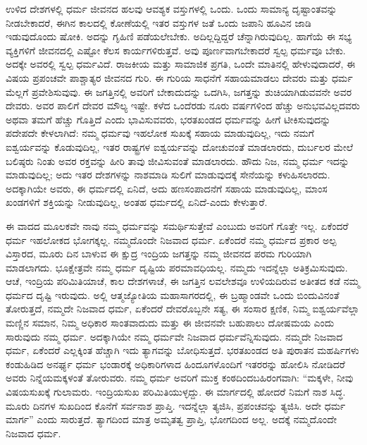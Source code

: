 ಉಳಿದ ದೇಶಗಳಲ್ಲಿ ಧರ್ಮ ಜೀವನದ ಹಲವು ಆವಶ್ಯಕ ವಸ್ತುಗಳಲ್ಲಿ ಒಂದು. ಒಂದು ಸಾಮಾನ್ಯ ದೃಷ್ಟಾಂತವನ್ನು ನೀಡಬೇಕಾದರೆ, ಈಗಿನ ಕಾಲದಲ್ಲಿ ಕೋಣೆಯಲ್ಲಿ ಇತರ ವಸ್ತುಗಳ ಜತೆ ಒಂದು ಜಪಾನಿ ಹೂವಿನ ಜಾಡಿ ಇಡುವು\-ದೊಂದು ಷೋಕಿ. ಅದನ್ನು ಗೃಹಿಣಿ ಪಡೆಯಲೇಬೇಕು. ಅದಿಲ್ಲದ್ದಿದ್ದರೆ ಚೆನ್ನಾಗಿರುವುದಿಲ್ಲ. ಹಾಗೆಯೆ ಈ ಸಭ್ಯ ವ್ಯಕ್ತಿಗಳಿಗೆ ಜೀವನದಲ್ಲಿ ಎಷ್ಟೋ ಕೆಲಸ ಕಾರ್ಯಗಳಿರುತ್ತವೆ. ಅವು ಪೂರ್ಣವಾಗಬೇಕಾದರೆ ಸ್ವಲ್ಪ ಧರ್ಮವೂ ಬೇಕು. ಅದಕ್ಕೇ ಅವರಲ್ಲಿ ಸ್ವಲ್ಪ ಧರ್ಮವಿದೆ. ರಾಜಕೀಯ ಮತ್ತು ಸಾಮಾಜಿಕ ಪ್ರಗತಿ, ಒಂದೇ ಮಾತಿನಲ್ಲಿ ಹೇಳುವುದಾದರೆ, ಈ ವಿಷಯ ಪ್ರಪಂಚವೇ ಪಾಶ್ಚಾತ್ಯರ ಜೀವನದ ಗುರಿ. ಈ ಗುರಿಯ ಸಾಧನೆಗೆ ಸಹಾಯಮಾಡಲು ದೇವರು ಮತ್ತು ಧರ್ಮ ಮೆಲ್ಲಗೆ ಪ್ರವೇಶಿಸುವುವು. ಈ ಜಗತ್ತಿನಲ್ಲಿ ಅವರಿಗೆ ಬೇಕಾದುದನ್ನು ಒದಗಿಸಿ, ಜಗತ್ತನ್ನು ಶುಚಿಯಾಗಿಡುವವನೇ ಅವರ ದೇವರು. ಅವರ ಪಾಲಿಗೆ ದೇವರ ಮೌಲ್ಯ ಇಷ್ಟೇ. ಕಳೆದ ಒಂದೆರಡು ನೂರು ವರ್ಷಗಳಿಂದ ಹೆಚ್ಚು ಅನುಭವವಿಲ್ಲದವರು ಅಥವಾ ತಮಗೆ ಹೆಚ್ಚು ಗೊತ್ತಿದೆ ಎಂದು ಭಾವಿಸುವವರು, ಭರತಖಂಡದ ಧರ್ಮವನ್ನು ಹೀಗೆ ಟೀಕಿಸುವುದನ್ನು ಪದೇಪದೇ ಕೇಳಲಾಗಿದೆ: ನಮ್ಮ ಧರ್ಮವು ಇಹಲೋಕ ಸುಖಕ್ಕೆ ಸಹಾಯ ಮಾಡುವುದಿಲ್ಲ, ಇದು ನಮಗೆ ಐಶ್ವರ್ಯವನ್ನು ಕೊಡುವುದಿಲ್ಲ, ಇತರ ರಾಷ್ಟ್ರಗಳ ಐಶ್ವರ್ಯವನ್ನು ದೋಚುವಂತೆ ಮಾಡ\-ಲಾರದು, ದುರ್ಬಲರ ಮೇಲೆ ಬಲಿಷ್ಠರು ನಿಂತು ಅವರ ರಕ್ತವನ್ನು ಹೀರಿ ತಾವು ಜೀವಿಸುವಂತೆ ಮಾಡಲಾರದು. ಹೌದು ನಿಜ, ನಮ್ಮ ಧರ್ಮ ಇದನ್ನು ಮಾಡುವುದಿಲ್ಲ; ಅದು ಇತರ ದೇಶಗಳನ್ನು ನಾಶಮಾಡಿ ಸುಲಿಗೆ ಮಾಡುವುದಕ್ಕೆ ಸೇನೆಯನ್ನು ಕಳುಹಿಸಲಾರದು. ಅದಕ್ಕಾಗಿಯೇ ಅವರು, ಈ ಧರ್ಮದಲ್ಲಿ ಏನಿದೆ, ಅದು ಹಣಸಂಪಾದನೆಗೆ ಸಹಾಯ ಮಾಡುವುದಿಲ್ಲ, ಮಾಂಸ ಖಂಡಗಳಿಗೆ ಶಕ್ತಿಯನ್ನು ನೀಡುವುದಿಲ್ಲ, ಅಂತಹ ಧರ್ಮದಲ್ಲಿ ಏನಿದೆ-ಎಂದು ಕೇಳುತ್ತಾರೆ.

ಈ ವಾದದ ಮೂಲಕವೇ ನಾವು ನಮ್ಮ ಧರ್ಮವನ್ನು ಸಮರ್ಥಿಸುತ್ತೇವೆ ಎಂಬುದು ಅವರಿಗೆ ಗೊತ್ತೇ ಇಲ್ಲ. ಏಕೆಂದರೆ ಧರ್ಮ ಇಹಲೋಕದ ಭೋಗಕ್ಕಲ್ಲ. ನಮ್ಮದೊಂದೇ ನಿಜವಾದ ಧರ್ಮ. ಏಕೆಂದರೆ ನಮ್ಮ ಧರ್ಮದ ಪ್ರಕಾರ ಅಲ್ಪ ವಿಸ್ತಾರದ, ಮೂರು ದಿನ ಬಾಳುವ ಈ ಕ್ಷುದ್ರ ಇಂದ್ರಿಯ ಜಗತ್ತನ್ನು ನಮ್ಮ ಜೀವನದ ಪರಮ ಗುರಿಯಾಗಿ ಮಾಡಲಾಗದು. ಭೂಕ್ಷೇತ್ರವೇ ನಮ್ಮ ಧರ್ಮ ದೃಷ್ಟಿಯ ಪರಮಾವಧಿಯಲ್ಲ. ನಮ್ಮದು ಇದನ್ನೆಲ್ಲಾ ಅತಿಕ್ರಮಿಸುವುದು. ಆಚೆ, ಇಂದ್ರಿಯ ಪರಿಮಿತಿಯಾಚೆ, ಕಾಲ ದೇಶಗಳಾಚೆ, ಈ ಜಗತ್ತಿನ ಲವಲೇಶವೂ ಉಳಿಯದಿರುವ ಅತೀತದ ಕಡೆ ನಮ್ಮ ಧರ್ಮದ ದೃಷ್ಟಿ ಇರುವುದು. ಅಲ್ಲಿ ಆತ್ಮಜ್ಯೋತಿಯ ಮಹಾಸಾಗರದಲ್ಲಿ, ಈ ಬ್ರಹ್ಮಾಂಡವೇ ಒಂದು ಬಿಂದುವಿನಂತೆ ತೋರುತ್ತದೆ, ನಮ್ಮದೇ ನಿಜವಾದ ಧರ್ಮ, ಏಕೆಂದರೆ ದೇವ\-ರೊಬ್ಬನೇ ಸತ್ಯ, ಈ ಸಂಸಾರ ಕ್ಷಣಿಕ, ನಿಮ್ಮ ಐಶ್ವರ್ಯವೆಲ್ಲಾ ಮಣ್ಣಿನ ಸಮಾನ, ನಿಮ್ಮ ಅಧಿಕಾರ ಸಾಂತವಾದುದು ಮತ್ತು ಈ ಜೀವನವೇ ಬಹುಪಾಲು ದೋಷಮಯ ಎಂದು ಸಾರುವುದು ನಮ್ಮ ಧರ್ಮ. ಅದಕ್ಕಾಗಿಯೇ ನಮ್ಮ ಧರ್ಮವೇ ನಿಜವಾದ ಧರ್ಮವೆನ್ನಿಸುವುದು. ನಮ್ಮದೇ ನಿಜವಾದ ಧರ್ಮ, ಏಕೆಂದರೆ ಎಲ್ಲಕ್ಕಿಂತ ಹೆಚ್ಚಾಗಿ ಇದು ತ್ಯಾಗವನ್ನು ಬೋಧಿಸುತ್ತದೆ. ಭರತಖಂಡದ ಅತಿ ಪುರಾತನ ಮಹರ್ಷಿಗಳು ಕಂಡುಹಿಡಿದ ಅನರ್ಘ್ಯ ಧರ್ಮ ಭಂಡಾರಕ್ಕೆ ಅಧಿಕಾರಿಗಳಾದ ಹಿಂದೂಗಳೊಂದಿಗೆ ಇತರರನ್ನು ಹೋಲಿಸಿ ನೋಡಿದರೆ ಅವರು ನಿನ್ನೆಯ\break ಮಕ್ಕಳಂತೆ ತೋರುವರು. ನಮ್ಮ ಧರ್ಮ ಅವರಿಗೆ ಮುಕ್ತ ಕಂಠದಿಂದ\break ಬಹಿರಂಗವಾಗಿ: “ಮಕ್ಕಳೇ, ನೀವು ವಿಷಯಸುಖಕ್ಕೆ ಗುಲಾಮರು. ಇಂದ್ರಿಯಸುಖ ಪರಿಮಿತಿಯುಳ್ಳದ್ದು. ಈ ಮಾರ್ಗದಲ್ಲಿ ಹೋದರೆ ನಿಮಗೆ ನಾಶ ಸಿದ್ಧ. ಮೂರು ದಿನಗಳ ಸುಖದಿಂದ ಕೊನೆಗೆ ಸರ್ವನಾಶ ಪ್ರಾಪ್ತಿ. ಇದನ್ನೆಲ್ಲಾ ತ್ಯಜಿಸಿ, ಪ್ರಪಂಚವನ್ನು ತ್ಯಜಿಸಿ. ಅದೇ ಧರ್ಮ ಮಾರ್ಗ” ಎಂದು ಸಾರುತ್ತದೆ. ತ್ಯಾಗದಿಂದ ಮಾತ್ರ ಅಮೃತತ್ವ ಪ್ರಾಪ್ತಿ, ಭೋಗದಿಂದ ಅಲ್ಲ. ಅದಕ್ಕೆ ನಮ್ಮದೊಂದೇ ನಿಜವಾದ ಧರ್ಮ.

